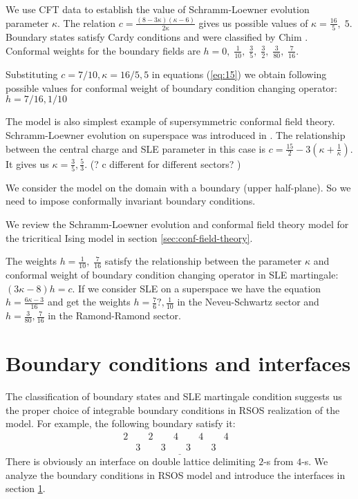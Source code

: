 \documentclass[12pt]{article}
\begin{document}
We use CFT data to establish the value of Schramm-Loewner evolution parameter $\kappa$. The relation
$c=\frac{(8-3\kappa)(\kappa-6)}{2\kappa}$ gives us possible values of
$\kappa=\frac{16}{5},\; 5$. Boundary states satisfy Cardy conditions and were
classified by Chim \cite{chim1996boundary}. Conformal weights for the boundary fields are $h=0,\;
\frac{1}{10},\; \frac{3}{5},\; \frac{3}{2},\; \frac{3}{80},\;
\frac{7}{16}$.

Substituting $c=7/10, \kappa=16/5, 5$ in equations (\ref{eq:15}) we
obtain following possible values for conformal weight of boundary
condition changing operator: $h=7/16,1/10$

The model is also simplest example of supersymmetric conformal field theory. Schramm-Loewner
evolution on superspace was introduced in \cite{nagi2005stochastic,rasmussen2004stochastic}. The
relationship between the central charge and SLE parameter in this case is
$c=\frac{15}{2}-3\left(\kappa+\frac{1}{\kappa}\right)$. It gives us
$\kappa=\frac{3}{5},\frac{5}{3}$. (? c different for different sectors? )

We consider the model on the domain with a boundary (upper half-plane). So we need to impose
conformally invariant boundary conditions. 

We review the Schramm-Loewner evolution and conformal field theory model for the tricritical Ising
model in section \ref{sec:conf-field-theory}. 

The weights $h=\frac{1}{10},\; \frac{7}{16}$ satisfy the relationship between the parameter $\kappa$
and conformal weight of boundary condition changing operator in SLE martingale: $(3\kappa-8) h =c$.
If we consider SLE on a superspace we have the equation $h=\frac{6\kappa-3}{16}$ and get the weights
$h=\frac{7}{6}?, \frac{1}{10}$ in the Neveu-Schwartz sector and $h=\frac{3}{80}, \frac{7}{16}$ in
the Ramond-Ramond sector.

\section{Boundary conditions and interfaces}
\label{sec:bound-cond-interf}


The classification of boundary states and SLE martingale condition suggests us the proper choice of
integrable boundary conditions in RSOS realization of the model. For example, the following boundary
satisfy it:
\begin{equation}
  \label{eq:2}
  \underline{\begin{array}{llllllllll}
    2 & & 2 & & 4 & & 4 & & 4\\
    &  3 & & 3 & & 3 & & 3 & &
  \end{array}}
\end{equation}
There is obviously an interface on double lattice delimiting $2$-s from $4$-s. We analyze the
boundary conditions in RSOS model and  introduce the interfaces in section
\ref{sec:bound-cond-interf}. 
\end{document}
